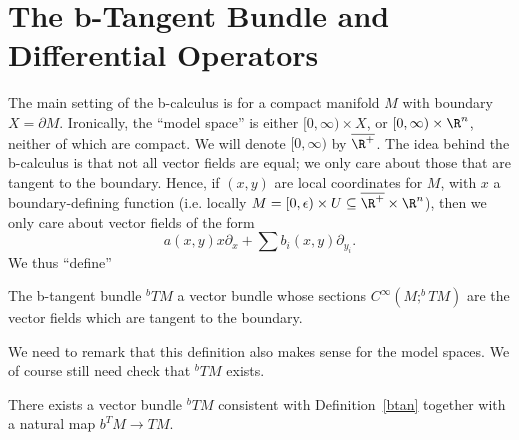 \documentclass[12pt]{article}
\begin{document}
\section{The b-Tangent Bundle and Differential Operators}
The main setting of the b-calculus is for a compact manifold $M$ with boundary $X = \partial M$. Ironically, the ``model space'' is either $[0,\infty)\times X$, or $[0,\infty)\times \R^n$, neither of which are compact. We will denote $[0,\infty)$ by $\overline{\R^+}$. The idea behind the b-calculus is that not all vector fields are equal; we only care about those that are tangent to the boundary. Hence, if $(x,y)$ are local coordinates for $M$, with $x$ a boundary-defining function (i.e. locally $M = [0,\epsilon)\times U \subseteq \overline{\R^+}\times\R^n$), then we only care about vector fields of the form
\[a(x,y)x\partial_x + \sum b_i(x,y)\partial_{y_i}.\] We thus ``define''
\begin{def}\label{btan}The b-tangent bundle $^bTM$ a vector bundle whose sections $C^\infty(M;^bTM)$ are the vector fields which are tangent to the boundary.\end{def}
We need to remark that this definition also makes sense for the model spaces. We of course still need check that $^b TM$ exists.
\begin{lem}There exists a vector bundle $^bTM$ consistent with Definition~\ref{btan} together with a natural map $b^TM \to TM$.\end{lem}
\end{document}
